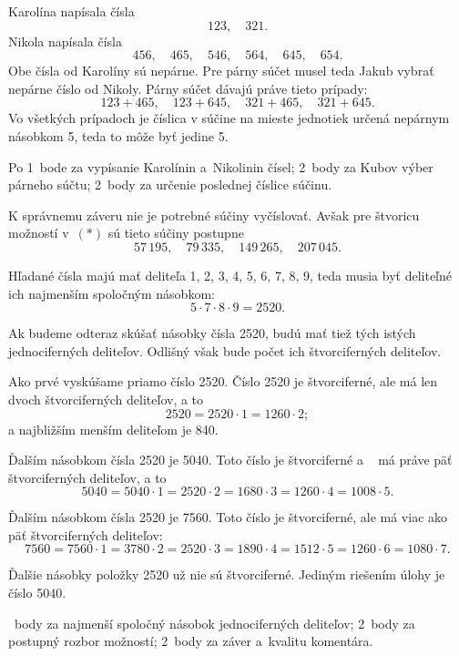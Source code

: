 {%
Karolína napísala čísla
$$
123, \quad 321.
$$
Nikola napísala čísla
$$
456, \quad 465, \quad 546, \quad 564, \quad 645, \quad 654.
$$
Obe čísla od Karolíny sú nepárne.
Pre párny súčet musel teda Jakub vybrať nepárne číslo od Nikoly.
Párny súčet dávajú práve tieto prípady:
$$
123+465, \quad 123+645, \quad 321+465, \quad 321+645 .
\tag{$*$}
$$
Vo všetkých prípadoch je číslica v súčine na mieste jednotiek určená nepárnym násobkom 5, teda to môže byť jedine 5.

\hodnotenie
Po 1~bode za vypísanie Karolínin a~Nikolinin čísel;
2~body za Kubov výber párneho súčtu;
2~body za určenie poslednej číslice súčinu.

\poznamka
K správnemu záveru nie je potrebné súčiny vyčíslovať.
Avšak pre štvoricu možností v~$(*)$ sú tieto súčiny postupne
$$
57\,195, \quad 79\,335, \quad 149\,265, \quad 207\,045 .
$$
\endhodnotenie
}

{%
Hľadané čísla majú mať deliteľa 1, 2, 3, 4, 5, 6, 7, 8, 9, teda musia byť deliteľné ich najmenším spoločným násobkom:
$$
5\cdot7\cdot8\cdot9=2520.
$$

Ak budeme odteraz skúšať násobky čísla 2520, budú mať tiež tých istých jednociferných deliteľov. Odlišný však bude počet ich štvorciferných deliteľov.

Ako prvé vyskúšame priamo číslo 2520. Číslo 2520 je štvorciferné, ale má len dvoch štvorciferných deliteľov, a to
$$
2520 =2520\cdot1 =1260\cdot2;
$$
a najbližším menším deliteľom je 840.

Ďalším násobkom čísla 2520 je 5040.
Toto číslo je štvorciferné a ~ má práve päť štvorciferných deliteľov, a to
$$
5040 =5040\cdot1 =2520\cdot2 =1680\cdot3 =1260\cdot4 =1008\cdot5.
$$

Ďalším násobkom čísla 2520 je 7560.
Toto číslo je štvorciferné, ale má viac ako päť štvorciferných deliteľov:
$$
7560 =7560\cdot1 = 3780\cdot2 =2520\cdot3 =1890\cdot4 =1512\cdot5 =1260\cdot6 =1080\cdot7 .
$$

Ďalšie násobky položky 2520 už nie sú štvorciferné.
Jediným riešením úlohy je číslo 5040.

~body za najmenší spoločný násobok jednociferných deliteľov;
2~body za postupný rozbor možností;
2~body za záver a~kvalitu komentára.
\endhodnotenie}

